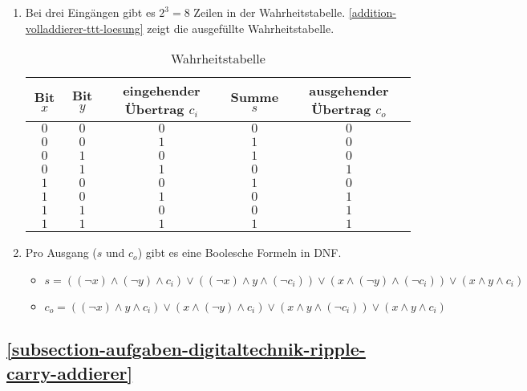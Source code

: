 \begin{enumerate}
	\item Bei drei Eingängen gibt es $2^3 = 8$ Zeilen in der Wahrheitstabelle. \autoref{addition-volladdierer-ttt-loesung} zeigt die ausgefüllte Wahrheitstabelle.

\begin{table}[ht]
\centering
\begin{tabular}{|c|c|c||c|c|}
\hline
Bit $x$ & Bit $y$ & eingehender Übertrag $c_i$ & Summe $s$ & ausgehender Übertrag $c_o$ \\ \hline
$0$ & $0$ & $0$ & $0$ & $0$ \\ \hline
$0$ & $0$ & $1$ & $1$ & $0$ \\ \hline
$0$ & $1$ & $0$ & $1$ & $0$ \\ \hline
$0$ & $1$ & $1$ & $0$ & $1$ \\ \hline
$1$ & $0$ & $0$ & $1$ & $0$ \\ \hline
$1$ & $0$ & $1$ & $0$ & $1$ \\ \hline
$1$ & $1$ & $0$ & $0$ & $1$ \\ \hline
$1$ & $1$ & $1$ & $1$ & $1$ \\ \hline
\end{tabular}
\caption{Wahrheitstabelle}
\label{addition-volladdierer-ttt-loesung}
\end{table}

\item Pro Ausgang ($s$ und $c_o$) gibt es eine Boolesche Formeln in \ac{DNF}.

\begin{itemize}
	\item $s = ((\neg x) \wedge (\neg y) \wedge c_i) \vee ((\neg x) \wedge y \wedge (\neg c_i)) \vee (x \wedge (\neg y) \wedge (\neg c_i)) \vee (x \wedge y \wedge c_i)$
	\item $c_o = ((\neg x) \wedge y \wedge c_i) \vee (x \wedge (\neg y) \wedge c_i) \vee (x \wedge y \wedge (\neg c_i)) \vee (x \wedge y \wedge c_i)$
\end{itemize}

\end{enumerate}

\newpage

\subsection*{\ref{subsection-aufgaben-digitaltechnik-ripple-carry-addierer} }

